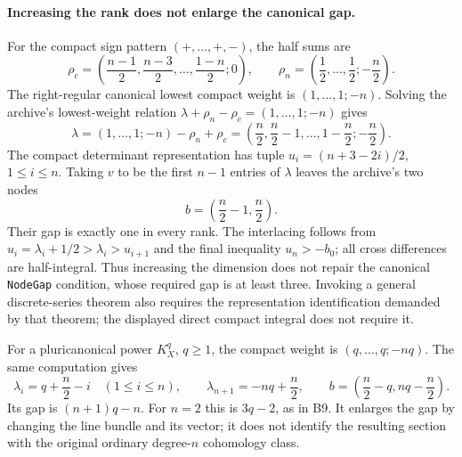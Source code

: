 \paragraph{Increasing the rank does not enlarge the canonical gap.}
For the compact sign pattern $(+,\ldots,+,-)$, the half sums are
\[
 \rho_c=\left(\frac{n-1}{2},\frac{n-3}{2},\ldots,
                         \frac{1-n}{2};0\right),\qquad
 \rho_n=\left(\frac12,\ldots,\frac12;-\frac n2\right).
\]
The right-regular canonical lowest compact weight is
$(1,\ldots,1;-n)$. Solving the archive's lowest-weight relation
$\lambda+\rho_n-\rho_c=(1,\ldots,1;-n)$ gives
\[
 \lambda=(1,\ldots,1;-n)-\rho_n+\rho_c
       =\left(\frac n2,\frac n2-1,\ldots,
                          1-\frac n2;-\frac n2\right).
\]
The compact determinant representation has tuple
$u_i=(n+3-2i)/2$, $1\leq i\leq n$.
Taking $v$ to be the first $n-1$ entries of $\lambda$ leaves
the archive's two nodes
\[
 b=\left(\frac n2-1,\frac n2\right).
\]
Their gap is exactly one in every rank.
The interlacing follows from
$u_i=\lambda_i+1/2>\lambda_i>u_{i+1}$ and the final inequality
$u_n>-\!b_0$; all cross differences are half-integral.
Thus increasing the dimension does not repair the canonical
\texttt{NodeGap} condition, whose required gap is at least
three. Invoking a general discrete-series theorem also requires
the representation identification demanded by that theorem;
the displayed direct compact integral does not require it.

For a pluricanonical power $K_X^q$, $q\geq1$, the compact weight
is $(q,\ldots,q;-nq)$. The same computation gives
\[
 \lambda_i=q+\frac n2-i\quad(1\leq i\leq n),\qquad
 \lambda_{n+1}=-nq+\frac n2,
 \qquad
 b=\left(\frac n2-q,nq-\frac n2\right).
\]
Its gap is $(n+1)q-n$. For $n=2$ this is $3q-2$, as in B9.
It enlarges the gap by changing the line bundle and its vector;
it does not identify the resulting section with the original
ordinary degree-$n$ cohomology class.
